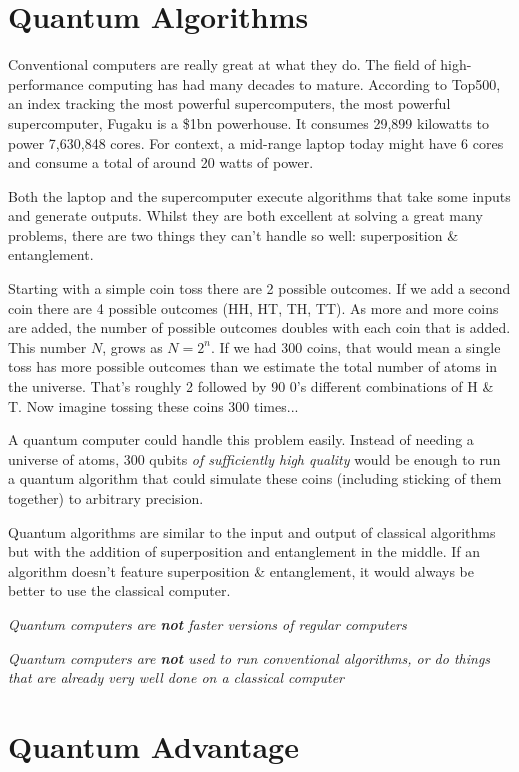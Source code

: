 \documentclass{book}
\begin{document}
\section{Quantum Algorithms} 

 Conventional computers are really great at what they do. The field of high-performance computing has had many decades to mature. According to Top500, an index tracking the most powerful supercomputers, the most powerful supercomputer, Fugaku is a \$1bn powerhouse. It consumes 29,899 kilowatts to power 7,630,848 cores. For context, a mid-range laptop today might have 6 cores and consume a total of around 20 watts of power. 

 Both the laptop and the supercomputer execute algorithms that take some inputs and generate outputs. Whilst they are both excellent at solving a great many problems, there are two things they can't handle so well: superposition \& entanglement. 

 Starting with a simple coin toss there are 2 possible outcomes. If we add a second coin there are 4 possible outcomes (HH, HT, TH, TT). As more and more coins are added, the number of possible outcomes doubles with each coin that is added. This number $N$, grows as $N = 2^n$. If we had 300 coins, that would mean a single toss has more possible outcomes than we estimate the total number of atoms in the universe. That's roughly 2 followed by 90 0's different combinations of H \& T. Now imagine tossing these coins 300 times...

 A quantum computer could handle this problem easily. Instead of needing a universe of atoms, 300 qubits \textit{of sufficiently high quality} would be enough to run a quantum algorithm that could simulate these coins (including sticking of them together) to arbitrary precision. 

 Quantum algorithms are similar to the input and output of classical algorithms but with the addition of superposition and entanglement in the middle.  If an algorithm doesn't feature superposition \& entanglement, it would always be better to use the classical computer. 


\emph{Quantum computers are \textbf{not} faster versions of regular computers}

\emph{ Quantum computers are \textbf{not} used to run conventional algorithms, or do things that are already very well done on a classical computer }

\section{Quantum Advantage} 
\end{document}
